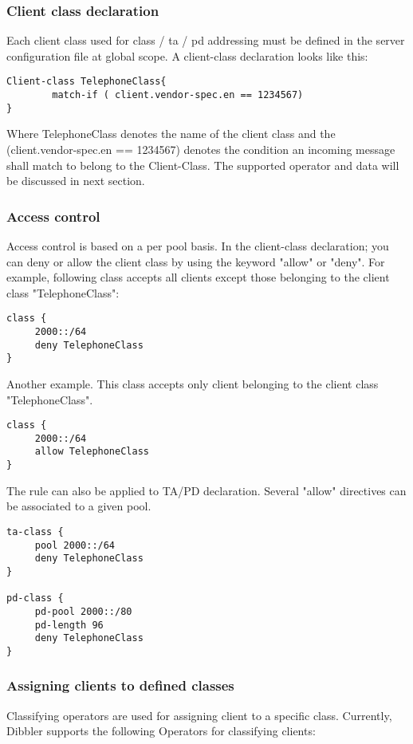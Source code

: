 \begin{enumerate}
\subsubsection{Client class  declaration}
Each client class used for class / ta / pd addressing must be defined
in the server configuration file at global scope. A client-class
declaration looks like this:

\begin{lstlisting}
Client-class TelephoneClass{
        match-if ( client.vendor-spec.en == 1234567)
}
\end{lstlisting}

Where TelephoneClass denotes the name of the client class and the
(client.vendor-spec.en == 1234567) denotes the condition an incoming
message shall match to belong to the Client-Class. The supported
operator and data will be discussed in next section.


\subsubsection{Access control}
Access control is based on a per pool basis. In the client-class
declaration; you can deny or allow the client class by using the
keyword "allow" or "deny". For example, following class accepts all
clients except those belonging to the client class "TelephoneClass":

\begin{lstlisting}
class {
     2000::/64
     deny TelephoneClass
}
\end{lstlisting}

Another example. This class accepts only client belonging to the
client class "TelephoneClass".

\begin{lstlisting}
class {
     2000::/64
     allow TelephoneClass
}
\end{lstlisting}

The rule can also be applied to TA/PD declaration. Several "allow"
directives can be associated to a given pool.

\begin{lstlisting}
ta-class {
     pool 2000::/64
     deny TelephoneClass
}

pd-class {
     pd-pool 2000::/80
     pd-length 96
     deny TelephoneClass
}
\end{lstlisting}

\subsubsection{Assigning clients to defined classes}
Classifying operators are used for assigning client to a specific class.
Currently, Dibbler supports the following Operators for classifying clients:


\end{enumerate}
